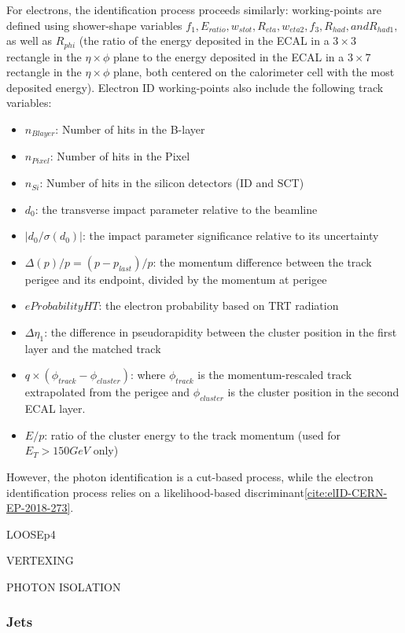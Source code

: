 For electrons, the identification process proceeds similarly: working-points are defined using shower-shape variables $f_{1}, E_{ratio}, w_{s tot}, R_{eta}, w_{eta2}, f_{3}, R_{had}, and R_{had1},$ as well as $R_{phi}$ (the ratio of the energy deposited in the ECAL in a $3 \times 3$ rectangle in the $\eta \times \phi$ plane to the energy deposited in the ECAL in a $3 \times 7$ rectangle in the $\eta \times \phi$ plane, both centered on the calorimeter cell with the most deposited energy). Electron ID working-points also include the following track variables:
\begin{itemize}
\item $n_{Blayer}$: Number of hits in the B-layer
\item $n_{Pixel}$: Number of hits in the Pixel
\item $n_{Si}$: Number of hits in the silicon detectors (ID and SCT)
\item $d_{0}$: the transverse impact parameter relative to the beamline
\item $|d_{0} / \sigma(d_{0})|$: the impact parameter significance relative to its uncertainty
\item $\Delta(p)/p = (p-p_{last})/p$: the momentum difference between the track perigee and its endpoint, divided by the momentum at perigee
\item $eProbabilityHT$: the electron probability based on TRT radiation
\item $\Delta \eta_{1}$: the difference in pseudorapidity between the cluster position in the first layer and the matched track
\item $q \times (\phi_{track}-\phi_{cluster})$: where $\phi_{track}$ is the momentum-rescaled track extrapolated from the perigee and $\phi_{cluster}$ is the cluster position in the second ECAL layer.
\item $E/p$: ratio of the cluster energy to the track momentum (used for $E_{T} > 150 GeV$ only) 
\end{itemize}

However, the photon identification is a cut-based process, while the electron identification process relies on a likelihood-based discriminant\ref{cite:elID-CERN-EP-2018-273}.

LOOSEp4

VERTEXING  

PHOTON ISOLATION

\subsubsection{Jets} \label{sec:Jets} 

